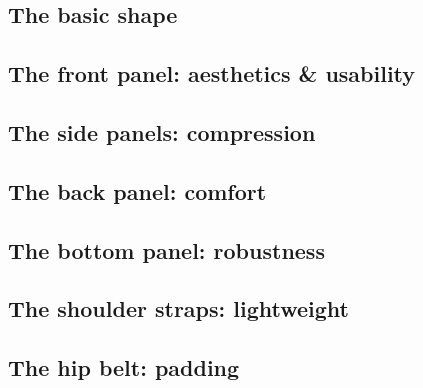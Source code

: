 

\subsection{The basic shape}


\subsection{The front panel: aesthetics \& usability}


\subsection{The side panels: compression}


\subsection{The back panel: comfort}


\subsection{The bottom panel: robustness}
\subsection{The shoulder straps: lightweight}
\subsection{The hip belt: padding}
